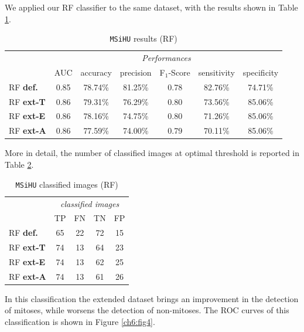 We applied our \Gls{RF} classifier to the same dataset, with the results shown in Table \ref{ch6:tab5}.


\begin{table}[!hbt]
\small
 \centering
 \begin{tabular}{lcccccc}
  \toprule
  & \multicolumn{6}{c}{\textit{Performances}} \\
  \cmidrule(lr){2-7}
  & AUC  & accuracy & precision & F$_1$-Score & sensitivity & specificity \\
  \midrule
  RF \textbf{def.}      & 0.85 & 78.74\% & 81.25\% & 0.78 & 82.76\% & 74.71\%  \\
  RF \textbf{ext-T}     & 0.86 & 79.31\% & 76.29\% & 0.80 & 73.56\% & 85.06\%  \\
  RF \textbf{ext-E}     & 0.86 & 78.16\% & 74.75\% & 0.80 & 71.26\% & 85.06\%  \\
  RF \textbf{ext-A}     & 0.86 & 77.59\% & 74.00\% & 0.79 & 70.11\% & 85.06\% \\
  \bottomrule
 \end{tabular}
 \caption{\texttt{MSiHU} results (RF)}
 \label{ch6:tab5}
\end{table}
 

 
More in detail, the number of classified images at optimal threshold is reported in Table \ref{ch6:tab6}.


\begin{table}[!hbt]
\small
 \centering
 \begin{tabular}{lcccc}
  \toprule
  & \multicolumn{4}{c}{\textit{classified images}} \\
  \cmidrule(lr){2-5}
   & TP  & FN & TN & FP  \\
   \midrule
    RF \textbf{def.}      & 65 & 22 & 72 & 15  \\
    RF \textbf{ext-T}     & 74 & 13 & 64 & 23  \\
    RF \textbf{ext-E}     & 74 & 13 & 62 & 25  \\
    RF \textbf{ext-A}     & 74 & 13 & 61 & 26 \\
    \bottomrule
 \end{tabular}
 \caption{\texttt{MSiHU} classified images (RF)}
 \label{ch6:tab6}
\end{table}  

In this classification the extended dataset brings an improvement in the detection of mitoses, while worsens the detection of non-mitoses.
The \Gls{ROC} curves of this classification is shown in Figure \ref{ch6:fig4}.

